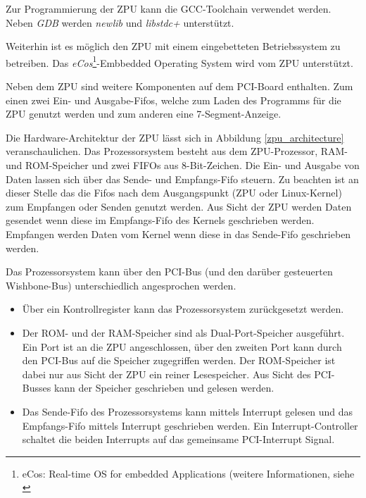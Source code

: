 \documentclass[11pt]{scrartcl}
\begin{document}
Zur Programmierung der ZPU kann die GCC-Toolchain verwendet werden. Neben \textit{GDB} werden \textit{newlib} und \textit{libstdc+} unterstützt.

Weiterhin ist es möglich den ZPU mit einem eingebetteten Betriebssystem zu betreiben. Das \textit{eCos}\footnote{eCos: Real-time OS for embedded Applications (weitere Informationen, siehe \cite{wp_eCos}}-Embbedded Operating System wird vom ZPU unterstützt. 

Neben dem ZPU sind weitere Komponenten auf dem PCI-Board enthalten. Zum einen zwei Ein- und Ausgabe-Fifos, welche zum Laden des Programms für die ZPU genutzt werden und zum anderen eine 7-Segment-Anzeige.

Die Hardware-Architektur der ZPU lässt sich in Abbildung \ref{zpu_architecture} veranschaulichen. Das Prozessorsystem besteht aus dem ZPU-Prozessor, RAM- und ROM-Speicher und zwei FIFOs aus 8-Bit-Zeichen. 
Die Ein- und Ausgabe von Daten lassen sich über das Sende- und Empfangs-Fifo steuern. Zu beachten ist an dieser Stelle das die Fifos nach dem Ausgangspunkt (ZPU oder Linux-Kernel) zum Empfangen oder Senden genutzt werden. Aus Sicht der ZPU werden Daten gesendet wenn diese im Empfangs-Fifo des Kernels geschrieben werden. Empfangen werden Daten vom Kernel wenn diese in das Sende-Fifo geschrieben werden. 

Das Prozessorsystem kann über den PCI-Bus (und den darüber gesteuerten Wishbone-Bus) unterschiedlich angesprochen werden. 
\begin{itemize}
    \item{Über ein Kontrollregister kann das Prozessorsystem zurückgesetzt werden.}

    \item{Der ROM- und der RAM-Speicher sind als Dual-Port-Speicher ausgeführt. Ein Port ist an die ZPU angeschlossen, über den zweiten Port kann durch den PCI-Bus auf die Speicher zugegriffen werden. Der ROM-Speicher ist dabei nur aus Sicht der ZPU ein reiner Lesespeicher. Aus Sicht des PCI-Busses kann der Speicher geschrieben und gelesen werden.}
    \item{Das Sende-Fifo des Prozessorsystems kann mittels Interrupt gelesen und das Empfangs-Fifo mittels Interrupt geschrieben werden. Ein Interrupt-Controller schaltet die beiden Interrupts auf das gemeinsame PCI-Interrupt Signal.}

\end{itemize}
\end{document}
